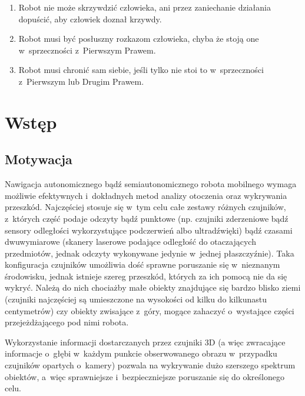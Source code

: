 

\begin{savequote}[90mm]
\begin{enumerate}
\item Robot nie może skrzywdzić człowieka, ani przez zaniechanie działania dopuścić, aby człowiek doznał krzywdy.\\
\item Robot musi być posłuszny rozkazom człowieka, chyba że stoją one w~sprzeczności z~Pierwszym Prawem.\\
\item Robot musi chronić sam siebie, jeśli tylko nie stoi to w~sprzeczności z~Pierwszym lub Drugim Prawem.\end{enumerate}
\end{savequote}


\chapter{Wstęp}
\label{chap:wstep}

\section{Motywacja}

Nawigacja autonomicznego bądź semiautonomicznego robota mobilnego wymaga możliwie
efektywnych i~dokładnych metod analizy otoczenia oraz wykrywania przeszkód.
Najczęściej stosuje się w~tym celu całe zestawy różnych czujników, z~których część
podaje odczyty bądź punktowe (np. czujniki zderzeniowe bądź sensory odległości
wykorzystujące podczerwień albo ultradźwięki) bądź czasami dwuwymiarowe (skanery
laserowe podające odległość do otaczających przedmiotów, jednak odczyty wykonywane
jedynie w~jednej płaszczyźnie). Taka konfiguracja czujników umożliwia dość sprawne
poruszanie się w~nieznanym środowisku, jednak istnieje szereg przeszkód, których za
ich pomocą nie da się wykryć. Należą do nich chociażby małe obiekty znajdujące
się bardzo blisko ziemi (czujniki najczęściej są umieszczone na wysokości od kilku
do kilkunastu centymetrów) czy obiekty zwisające z~góry, mogące zahaczyć o~wystające
części przejeżdżającego pod nimi robota.

Wykorzystanie informacji dostarczanych przez czujniki 3D (a więc zwracające informacje
o~głębi w~każdym punkcie obserwowanego obrazu w~przypadku czujników opartych o~kamery)
pozwala na wykrywanie dużo szerszego spektrum obiektów, a~więc sprawniejsze i~bezpieczniejsze
poruszanie się do określonego celu.

